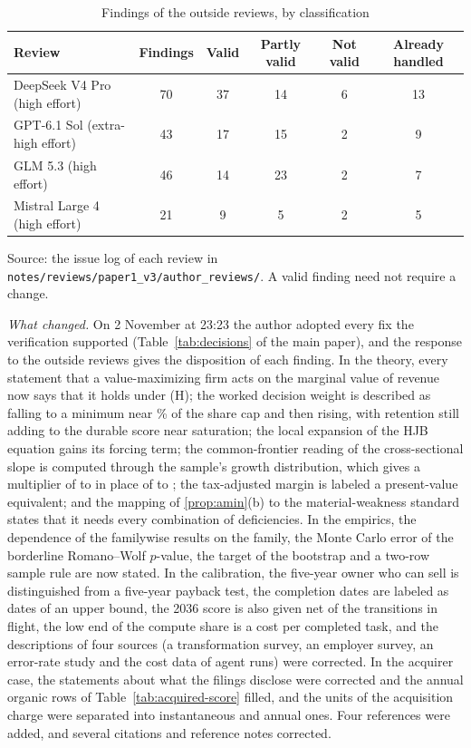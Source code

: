 \begin{table}[!ht]\centering\footnotesize
\caption{Findings of the outside reviews, by classification}\label{tab:outside-counts}
\begin{tabular}{@{}lccccc@{}}\toprule
Review & Findings & Valid & Partly valid & Not valid & Already handled\\\midrule
DeepSeek V4 Pro (high effort) & 70 & 37 & 14 & 6 & 13\\
GPT-6.1 Sol (extra-high effort) & 43 & 17 & 15 & 2 & 9\\
GLM 5.3 (high effort) & 46 & 14 & 23 & 2 & 7\\
Mistral Large 4 (high effort) & 21 & 9 & 5 & 2 & 5\\\bottomrule
\end{tabular}
\par\vspace{2pt}\footnotesize Source: the issue log of each review in \texttt{notes/reviews/paper1\_v3/\allowbreak author\_reviews/}. A valid finding need not require a change.
\end{table}

\emph{What changed.} On 2 November at 23:23 the author adopted every fix the verification supported (Table~\ref{tab:decisions} of the main paper), and the response to the outside reviews gives the disposition of each finding. In the theory, every statement that a value-maximizing firm acts on the marginal value of revenue now says that it holds under (H); the worked decision weight is described as falling to a minimum near \VpMinAt\% of the share cap and then rising, with retention still adding to the durable score near saturation; the local expansion of the HJB equation gains its forcing term; the common-frontier reading of the cross-sectional slope is computed through the sample's growth distribution, which gives a multiplier of \PsiMultLo{} to \PsiMultHi{} in place of \PsiMultApproxLo{} to \PsiMultApproxHi; the tax-adjusted margin is labeled a present-value equivalent; and the mapping of \autoref{prop:amin}(b) to the material-weakness standard states that it needs every combination of deficiencies. In the empirics, the dependence of the familywise results on the family, the Monte Carlo error of the borderline Romano--Wolf $p$-value, the target of the bootstrap and a two-row sample rule are now stated. In the calibration, the five-year owner who can sell is distinguished from a five-year payback test, the completion dates are labeled as dates of an upper bound, the 2036 score is also given net of the transitions in flight, the low end of the compute share is a cost per completed task, and the descriptions of four sources (a transformation survey, an employer survey, an error-rate study and the cost data of agent runs) were corrected. In the acquirer case, the statements about what the filings disclose were corrected and the annual organic rows of Table~\ref{tab:acquired-score} filled, and the units of the acquisition charge were separated into instantaneous and annual ones. Four references were added, and several citations and reference notes corrected.

